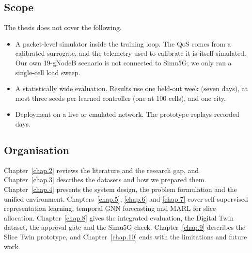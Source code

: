 \subsection{Scope}
The thesis does not cover the following.
\begin{itemize}
	\item A packet-level simulator inside the training loop. The QoS comes from a calibrated surrogate, and the telemetry used to calibrate it is itself simulated. Our own 19-gNodeB scenario is not connected to Simu5G; we only ran a single-cell load sweep.
	\item A statistically wide evaluation. Results use one held-out week (seven days), at most three seeds per learned controller (one at 100 cells), and one city.
	\item Deployment on a live or emulated network. The prototype replays recorded days.
\end{itemize}

\subsection{Organisation}
Chapter~\ref{chap.2} reviews the literature and the research gap, and Chapter~\ref{chap.3} describes the datasets and how we prepared them. Chapter~\ref{chap.4} presents the system design, the problem formulation and the unified environment. Chapters~\ref{chap.5}, \ref{chap.6} and \ref{chap.7} cover self-supervised representation learning, temporal GNN forecasting and MARL for slice allocation. Chapter~\ref{chap.8} gives the integrated evaluation, the Digital Twin dataset, the approval gate and the Simu5G check. Chapter~\ref{chap.9} describes the Slice Twin prototype, and Chapter~\ref{chap.10} ends with the limitations and future work.
